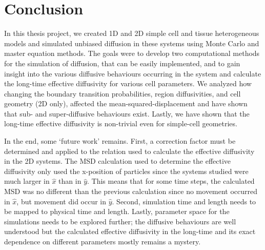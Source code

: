 \chapter{Conclusion}
	
	In this thesis project, we created 1D and 2D simple cell and tissue heterogeneous models and simulated unbiased diffusion in these systems using Monte Carlo and master equation methods. The goals were to develop two computational methods for the simulation of diffusion, that can be easily implemented, and to gain insight into the various diffusive behaviours occurring in the system and calculate the long-time effective diffusivity for various cell parameters. We analyzed how changing the boundary transition probabilities, region diffusivities, and cell geometry (2D only), affected the mean-squared-displacement and have shown that sub- and super-diffusive behaviours exist. Lastly, we have shown that the long-time effective diffusivity is non-trivial even for simple-cell geometries.
	
	In the end, some `future work' remains. First, a correction factor must be determined and applied to the relation used to calculate the effective diffusivity in the 2D systems. The MSD calculation used to determine the effective diffusivity only used the x-position of particles since the systems studied were much larger in $ \hat{x} $ than in $ \hat{y} $. This means that for some time steps, the calculated MSD was no different than the previous calculation since no movement occurred in $ \hat{x} $, but movement did occur in $ \hat{y} $. Second, simulation time and length needs to be mapped to physical time and length. Lastly, parameter space for the simulations needs to be explored further; the diffusive behaviours are well understood but the calculated effective diffusivity in the long-time and its exact dependence on different parameters mostly remains a mystery.